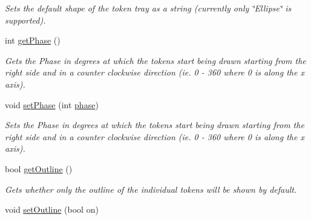 \begin{DoxyCompactItemize}
\begin{DoxyCompactList}\small\item\em Sets the default shape of the token tray as a string (currently only \char`\"{}\-Ellipse\char`\"{} is supported). \end{DoxyCompactList}\item 
\hypertarget{class_picto_1_1_token_tray_graphic_a096ba5967c3f77efd3d1ac52c79414eb}{int \hyperlink{class_picto_1_1_token_tray_graphic_a096ba5967c3f77efd3d1ac52c79414eb}{get\-Phase} ()}\label{class_picto_1_1_token_tray_graphic_a096ba5967c3f77efd3d1ac52c79414eb}

\begin{DoxyCompactList}\small\item\em Gets the Phase in degrees at which the tokens start being drawn starting from the right side and in a counter clockwise direction (ie. 0 -\/ 360 where 0 is along the x axis). \end{DoxyCompactList}\item 
\hypertarget{class_picto_1_1_token_tray_graphic_a0f4956e4d43935ee3606993ec061a3a0}{void \hyperlink{class_picto_1_1_token_tray_graphic_a0f4956e4d43935ee3606993ec061a3a0}{set\-Phase} (int \hyperlink{class_picto_1_1_token_tray_graphic_a019bd4a52363392d10f7058608a03fdd}{phase})}\label{class_picto_1_1_token_tray_graphic_a0f4956e4d43935ee3606993ec061a3a0}

\begin{DoxyCompactList}\small\item\em Sets the Phase in degrees at which the tokens start being drawn starting from the right side and in a counter clockwise direction (ie. 0 -\/ 360 where 0 is along the x axis). \end{DoxyCompactList}\item 
\hypertarget{class_picto_1_1_token_tray_graphic_ae6c0a3ac4d8e1ac31952be8be23a1b67}{bool \hyperlink{class_picto_1_1_token_tray_graphic_ae6c0a3ac4d8e1ac31952be8be23a1b67}{get\-Outline} ()}\label{class_picto_1_1_token_tray_graphic_ae6c0a3ac4d8e1ac31952be8be23a1b67}

\begin{DoxyCompactList}\small\item\em Gets whether only the outline of the individual tokens will be shown by default. \end{DoxyCompactList}\item 
\hypertarget{class_picto_1_1_token_tray_graphic_a45558728cfc6a0ef803c75062d9e9285}{void \hyperlink{class_picto_1_1_token_tray_graphic_a45558728cfc6a0ef803c75062d9e9285}{set\-Outline} (bool on)}\label{class_picto_1_1_token_tray_graphic_a45558728cfc6a0ef803c75062d9e9285}


\end{DoxyCompactItemize}
